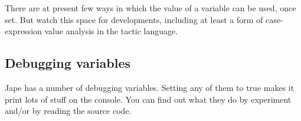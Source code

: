 There are at present few ways in which the value of a variable can be used, once set. But watch this space for developments, including at least a form of case-expression value analysis in the tactic language.


\subsection{Debugging variables}


Jape has a number of debugging variables. Setting any of them to true makes it print lots of stuff on the console. You can find out what they do by experiment and/or by reading the source code.

 